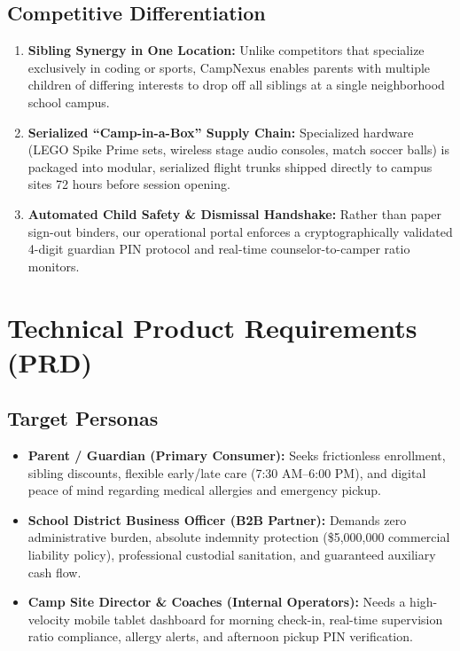 \documentclass[11pt,a4paper]{article}
\begin{document}
\subsection{Competitive Differentiation}
\begin{enumerate}
    \item \textbf{Sibling Synergy in One Location:} Unlike competitors that specialize exclusively in coding or sports, CampNexus enables parents with multiple children of differing interests to drop off all siblings at a single neighborhood school campus.
    \item \textbf{Serialized ``Camp-in-a-Box'' Supply Chain:} Specialized hardware (LEGO Spike Prime sets, wireless stage audio consoles, match soccer balls) is packaged into modular, serialized flight trunks shipped directly to campus sites 72 hours before session opening.
    \item \textbf{Automated Child Safety \& Dismissal Handshake:} Rather than paper sign-out binders, our operational portal enforces a cryptographically validated 4-digit guardian PIN protocol and real-time counselor-to-camper ratio monitors.
\end{enumerate}

\section{Technical Product Requirements (PRD)}

\subsection{Target Personas}
\begin{itemize}
    \item \textbf{Parent / Guardian (Primary Consumer):} Seeks frictionless enrollment, sibling discounts, flexible early/late care (7:30 AM--6:00 PM), and digital peace of mind regarding medical allergies and emergency pickup.
    \item \textbf{School District Business Officer (B2B Partner):} Demands zero administrative burden, absolute indemnity protection (\$5,000,000 commercial liability policy), professional custodial sanitation, and guaranteed auxiliary cash flow.
    \item \textbf{Camp Site Director \& Coaches (Internal Operators):} Needs a high-velocity mobile tablet dashboard for morning check-in, real-time supervision ratio compliance, allergy alerts, and afternoon pickup PIN verification.
\end{itemize}
\end{document}
